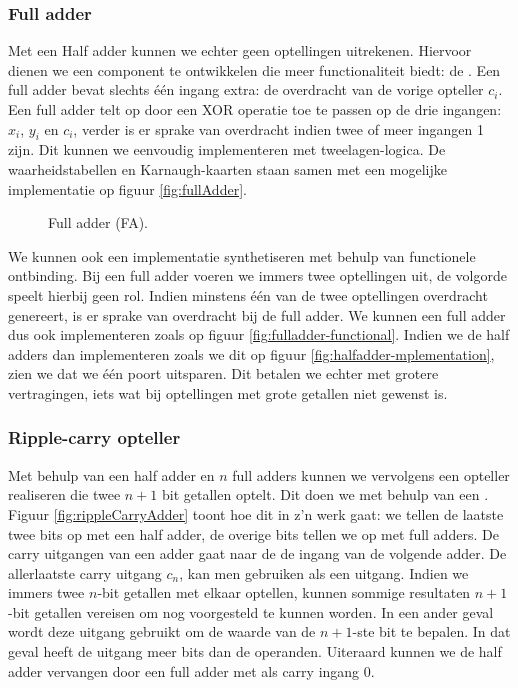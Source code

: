 \subsubsection{Full adder}
\label{sss:fulladder}
Met een Half adder kunnen we echter geen optellingen uitrekenen. Hiervoor dienen we een component te ontwikkelen die meer functionaliteit biedt: de . Een full adder bevat slechts \'e\'en ingang extra: de overdracht van de vorige opteller $c_i$. Een full adder telt op door een XOR operatie toe te passen op de drie ingangen: $x_i$, $y_i$ en $c_i$, verder is er sprake van overdracht indien twee of meer ingangen 1 zijn. Dit kunnen we eenvoudig implementeren met tweelagen-logica. De waarheidstabellen en Karnaugh-kaarten staan samen met een mogelijke implementatie op figuur \ref{fig:fullAdder}.
\begin{figure}[hbt]
\centering
{}
\caption{Full adder (FA).}
\end{figure}
We kunnen ook een implementatie synthetiseren met behulp van functionele ontbinding. Bij een full adder voeren we immers twee optellingen uit, de volgorde speelt hierbij geen rol. Indien minstens \'e\'en van de twee optellingen overdracht genereert, is er sprake van overdracht bij de full adder. We kunnen een full adder dus ook implementeren zoals op figuur \ref{fig:fulladder-functional}. Indien we de half adders dan implementeren zoals we dit op figuur \ref{fig:halfadder-mplementation}, zien we dat we \'e\'en poort uitsparen. Dit betalen we echter met grotere vertragingen, iets wat bij optellingen met grote getallen niet gewenst is.
\subsubsection{Ripple-carry opteller}
Met behulp van een half adder en $n$ full adders kunnen we vervolgens een opteller realiseren die twee $n+1$ bit getallen optelt. Dit doen we met behulp van een . Figuur \ref{fig:rippleCarryAdder}
toont hoe dit in z'n werk gaat: we tellen de laatste twee bits op met een half adder, de overige bits tellen we op met full adders. De carry uitgangen van een adder gaat naar de de ingang van de volgende adder. De allerlaatste carry uitgang $c_n$, kan men gebruiken als een  uitgang. Indien we immers twee $n$-bit getallen met elkaar optellen, kunnen sommige resultaten $n+1$-bit getallen vereisen om nog voorgesteld te kunnen worden. In een ander geval wordt deze uitgang gebruikt om de waarde van de $n+1$-ste bit te bepalen. In dat geval heeft de uitgang meer bits dan de operanden. Uiteraard kunnen we de half adder vervangen door een full adder met als carry ingang 0.
